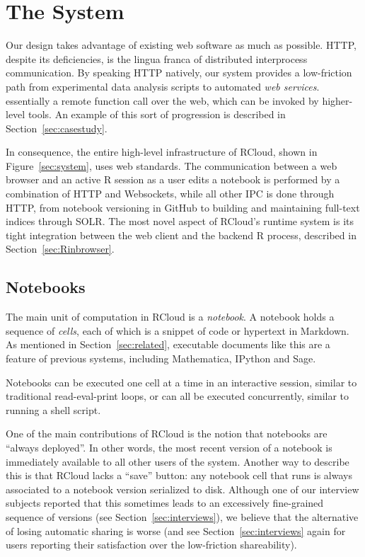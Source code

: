 \section{The System\label{sec:system}}

Our design takes advantage of existing web software as much as possible.
HTTP, despite its deficiencies, is the lingua franca of distributed
interprocess communication. By speaking HTTP natively, our system
provides a low-friction path from experimental data analysis scripts
to automated \emph{web services}. 
essentially a remote function call over
the web, which can be invoked by higher-level tools. An example of
this sort of progression is described in Section~\ref{sec:casestudy}.

In consequence, the entire high-level infrastructure of RCloud, shown
in Figure~\ref{sec:system}, uses web standards. The communication between
a web browser and an active R session as a user edits a notebook is
performed by a combination of HTTP and Websockets, while all other IPC
is done through HTTP, from notebook versioning in GitHub to building and
maintaining full-text indices through SOLR. The most novel aspect
of RCloud's runtime system is its tight integration between the web client
and the backend R process, described in Section~\ref{sec:Rinbrowser}.

\subsection{Notebooks\label{sec:notebooks}}

The main unit of computation in RCloud is a \emph{notebook}.  A
notebook holds a sequence of \emph{cells}, each of which is a snippet
of code or hypertext in Markdown. As mentioned in
Section~\ref{sec:related}, executable documents like
this are a feature of previous systems, including Mathematica,
IPython and Sage.

Notebooks can be executed one cell at a time in an interactive
session, similar to traditional read-eval-print
loops, or can all be executed concurrently,
similar to running a shell script.

One of the main contributions of RCloud is the notion that notebooks are
``always deployed''. In other words, the most recent version of a
notebook is immediately available to all other users of the system.
Another way to describe this is that
RCloud lacks a ``save'' button: any notebook cell that runs is always
associated to a notebook version serialized to disk. Although one of
our interview subjects reported that this sometimes leads to an
excessively fine-grained sequence of versions (see
Section~\ref{sec:interviews}), we believe that the alternative of
losing automatic sharing is worse (and see
Section~\ref{sec:interviews} again for users reporting their
satisfaction over the low-friction shareability).

